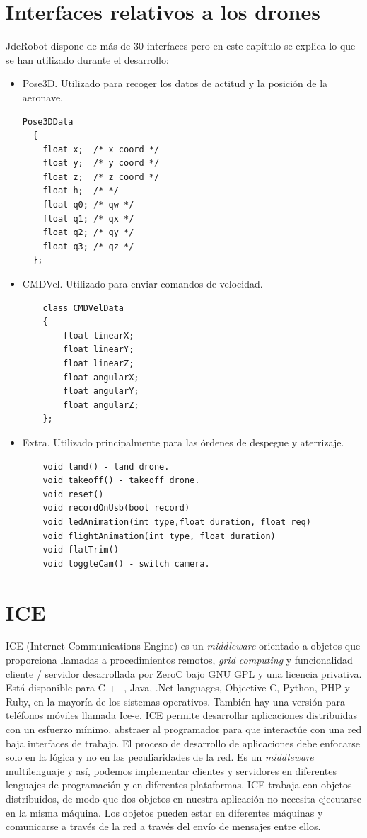 \section{Interfaces relativos a los drones}
JdeRobot dispone de más de 30 interfaces pero en este cap\'itulo se explica lo que se han utilizado durante el desarrollo:
\begin{itemize}
\item Pose3D. Utilizado para recoger los datos de actitud y la posici\'on de la aeronave.
{\scriptsize
\begin{verbatim}
Pose3DData
  {
	float x;  /* x coord */
	float y;  /* y coord */
	float z;  /* z coord */
  	float h;  /* */
	float q0; /* qw */
	float q1; /* qx */
	float q2; /* qy */
	float q3; /* qz */
  };
\end{verbatim}}
\item CMDVel. Utilizado para enviar comandos de velocidad.
{\scriptsize
\begin{verbatim}
	class CMDVelData
	{
		float linearX;
		float linearY;
		float linearZ;
		float angularX;
		float angularY;
		float angularZ;										
	};

\end{verbatim}}
\item Extra. Utilizado principalmente para las \'ordenes de despegue y aterrizaje.
{\scriptsize
\begin{verbatim}
    void land() - land drone. 
    void takeoff() - takeoff drone. 
    void reset() 
    void recordOnUsb(bool record) 
    void ledAnimation(int type,float duration, float req) 
    void flightAnimation(int type, float duration) 
    void flatTrim() 
    void toggleCam() - switch camera. 
\end{verbatim}}

\end{itemize}

\section{ICE}
\label{sec:ICE}
ICE (Internet Communications Engine) es un \textit{middleware}  orientado a objetos que proporciona llamadas a procedimientos remotos, \textit{grid computing} y funcionalidad cliente / servidor desarrollada por ZeroC bajo GNU GPL y una licencia privativa. Está disponible para C ++,
Java, .Net languages, Objective-C, Python, PHP y Ruby, en la mayoría de los sistemas operativos. También hay una versión para teléfonos móviles llamada Ice-e. ICE permite desarrollar aplicaciones distribuidas con un esfuerzo mínimo, abstraer al programador para que interactúe con una red baja interfaces de trabajo. El proceso de desarrollo de aplicaciones debe enfocarse solo en la lógica y no en las peculiaridades de la red. Es un \textit{middleware} multilenguaje y así, podemos implementar clientes y servidores en diferentes lenguajes de programación y en diferentes plataformas. ICE trabaja con objetos distribuidos, de modo que dos objetos en nuestra aplicación no necesita ejecutarse en la misma máquina. Los objetos pueden estar en diferentes máquinas y comunicarse a través de la red a través del envío de mensajes entre ellos.

